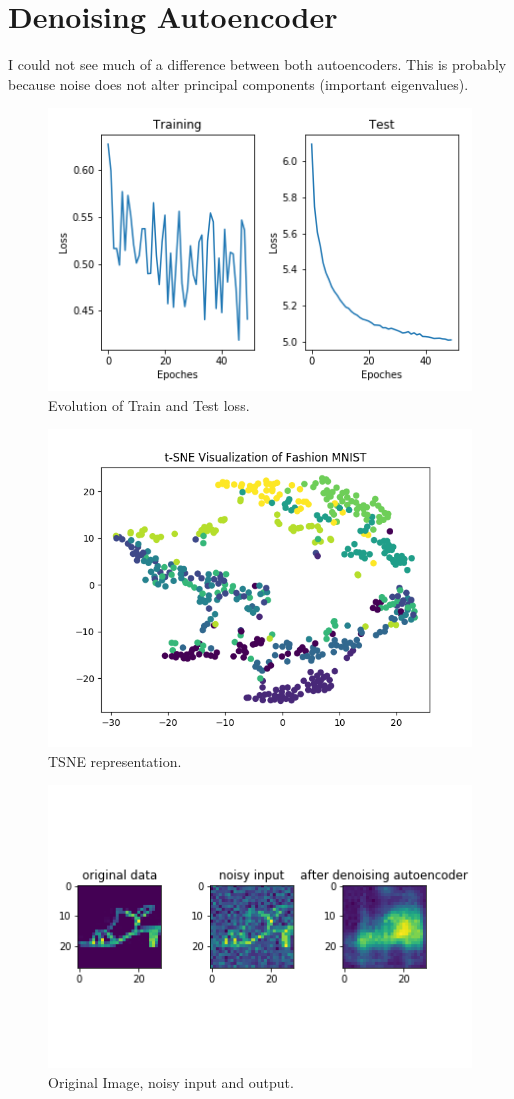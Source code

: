 \documentclass[11pt,a4paper,oneside]{article}
\begin{document}
\section{Denoising Autoencoder}
I could not see much of a difference between both autoencoders. 
This is probably because noise does not alter principal components (important eigenvalues).
\begin{figure}
	\centering
	\includegraphics[width=.9\textwidth]{figures/auto_encoder_de_evolution}
	\caption{Evolution of Train and Test loss.}
\end{figure}
\begin{figure}[!btp]
	\centering
	\includegraphics[width=.9\textwidth]{figures/t_sne_denois}
	\caption{TSNE representation.}
\end{figure}
\begin{figure}[!btp]
	\centering
	\includegraphics[width=.6\textwidth]{figures/save_ev_de_0}
	\caption{Original Image, noisy input and output.}
\end{figure}
\end{document}
